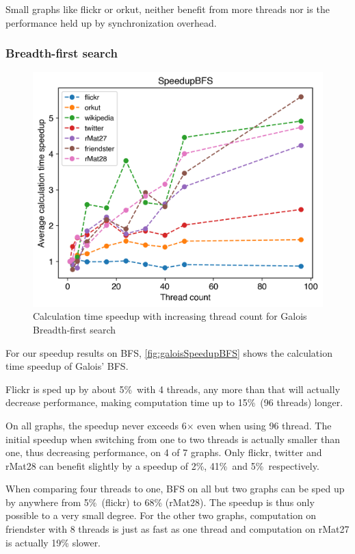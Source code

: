 Small graphs like flickr or orkut, neither benefit from more threads nor is the performance held up by synchronization overhead. 



\subsubsection{Breadth-first search}
\begin{figure}
	\includegraphics[width=\linewidth]{../../plots/singleNodeBFSGaloisThreads.png}
	\caption{Calculation time speedup with increasing thread count for Galois Breadth-first search}
	\label{fig:galoisSpeedupBFS}
\end{figure}

For our speedup results on BFS, \autoref{fig:galoisSpeedupBFS} shows the calculation time speedup of Galois' BFS.

Flickr is sped up by about 5\%\ with 4 threads, any more than that will actually decrease performance, making computation time up to 15\%\ (96 threads) longer.

On all graphs, the speedup never exceeds 6$\times$ even when using 96 thread.
The initial speedup when switching from one to two threads is actually smaller than one, thus decreasing performance, on 4 of 7 graphs. Only flickr, twitter and rMat28 can benefit slightly by a speedup of 2\%, 41\%\ and 5\%\ respectively.

When comparing four threads to one, BFS on all but two graphs can be sped up by anywhere from 5\%\ (flickr) to 68\% (rMat28). The speedup is thus only possible to a very small degree.
For the other two graphs, computation on friendster with 8 threads is just as fast as one thread and computation on rMat27 is actually 19\% slower.








